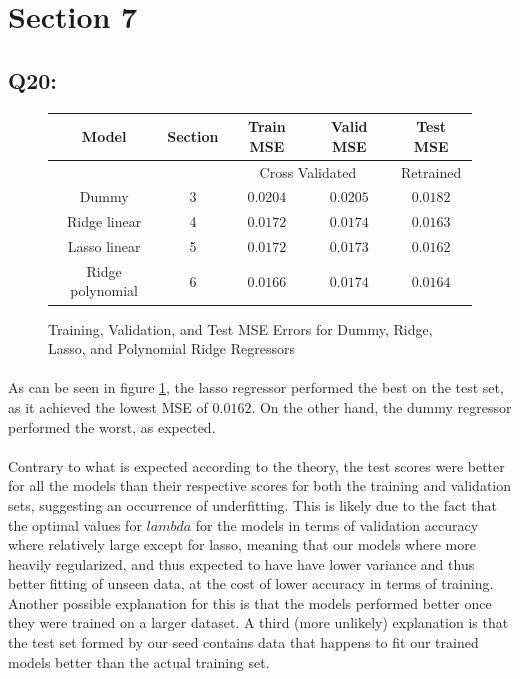 \documentclass{article}
\begin{document}
\section*{Section 7}
\subsection*{Q20:}
    \begin{figure}[H]
        \centering
        \begin{tabular}{|c|c|c|c|c|}
            \hline
            \rowcolor{gray!60}
            Model & Section & Train MSE & Valid MSE & Test MSE\\ \hline
            \rowcolor{gray!20}
            ~&~ & \multicolumn{2}{c|}{Cross Validated} & Retrained \\ \hline
            Dummy & 3 & $0.0204$ & $0.0205$ & $0.0182$\\ \hline
            Ridge linear & 4 & $0.0172$ & $0.0174$ & $0.0163$\\ \hline
            Lasso linear & 5 & $0.0172$ & $0.0173$ & $0.0162$\\ \hline
            Ridge polynomial & 6 & $0.0166$ & $0.0174$ & $0.0164$\\ \hline
        \end{tabular}
        \caption{Training, Validation, and Test MSE Errors for Dummy, Ridge, Lasso, and Polynomial Ridge Regressors}
        \label{fig:q20}
    \end{figure}
    \paragraph*{}
    As can be seen in figure \ref{fig:q20}, the lasso regressor performed the best on the test set, as it achieved the lowest MSE of $0.0162$. On the other hand, the dummy regressor performed the worst, as expected. 
    \paragraph*{}
    Contrary to what is expected according to the theory, the test scores were better for all the models than their respective scores for both the training and validation sets, suggesting an occurrence of underfitting. This is likely due to the fact that the optimal values for $lambda$ for the models in terms of validation accuracy where relatively large except for lasso, meaning that our models where more heavily regularized, and thus expected to have have lower variance and thus better fitting of unseen data, at the cost of lower accuracy in terms of training.  Another possible explanation for this is that the models performed better once they were trained on a larger dataset. A third (more unlikely) explanation is that the test set formed by our seed contains data that happens to  fit our trained models better than the actual training set. 
\end{document}
